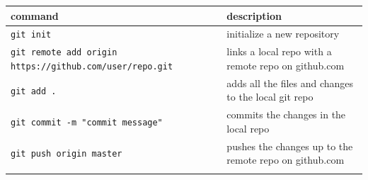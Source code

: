 \documentclass{book}
\begin{document}
\begin{longtable}[]{@{}ll@{}}
\toprule
\begin{minipage}[b]{0.05\columnwidth}\raggedright\strut
command\strut
\end{minipage} & \begin{minipage}[b]{0.05\columnwidth}\raggedright\strut
description\strut
\end{minipage}\tabularnewline
\midrule
\endhead
\begin{minipage}[t]{0.05\columnwidth}\raggedright\strut
\lstinline!git init!\strut
\end{minipage} & \begin{minipage}[t]{0.05\columnwidth}\raggedright\strut
initialize a new repository\strut
\end{minipage}\tabularnewline
\begin{minipage}[t]{0.05\columnwidth}\raggedright\strut
\lstinline!git remote add origin https://github.com/user/repo.git!\strut
\end{minipage} & \begin{minipage}[t]{0.05\columnwidth}\raggedright\strut
links a local repo with a remote repo on github.com\strut
\end{minipage}\tabularnewline
\begin{minipage}[t]{0.05\columnwidth}\raggedright\strut
\lstinline!git add .!\strut
\end{minipage} & \begin{minipage}[t]{0.05\columnwidth}\raggedright\strut
adds all the files and changes to the local git repo\strut
\end{minipage}\tabularnewline
\begin{minipage}[t]{0.05\columnwidth}\raggedright\strut
\lstinline!git commit -m "commit message"!\strut
\end{minipage} & \begin{minipage}[t]{0.05\columnwidth}\raggedright\strut
commits the changes in the local repo\strut
\end{minipage}\tabularnewline
\begin{minipage}[t]{0.05\columnwidth}\raggedright\strut
\lstinline!git push origin master!\strut
\end{minipage} & \begin{minipage}[t]{0.05\columnwidth}\raggedright\strut
pushes the changes up to the remote repo on github.com\strut
\end{minipage}\tabularnewline
\begin{minipage}[t]{0.05\columnwidth}\raggedright\strut

\end{minipage}
\end{longtable}
\end{document}

